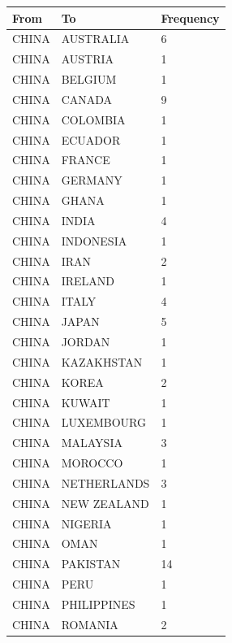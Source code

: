 \begin{longtable}{@{}|l|l|l|@{}}
\toprule
From  & To              & Frequency \\* \midrule
\endfirsthead
%
\endhead
%
\bottomrule
\endfoot
%
\endlastfoot
%
CHINA & AUSTRALIA       & 6         \\
CHINA & AUSTRIA         & 1         \\
CHINA & BELGIUM         & 1         \\
CHINA & CANADA          & 9         \\
CHINA & COLOMBIA        & 1         \\
CHINA & ECUADOR         & 1         \\
CHINA & FRANCE          & 1         \\
CHINA & GERMANY         & 1         \\
CHINA & GHANA           & 1         \\
CHINA & INDIA           & 4         \\
CHINA & INDONESIA       & 1         \\
CHINA & IRAN            & 2         \\
CHINA & IRELAND         & 1         \\
CHINA & ITALY           & 4         \\
CHINA & JAPAN           & 5         \\
CHINA & JORDAN          & 1         \\
CHINA & KAZAKHSTAN      & 1         \\
CHINA & KOREA           & 2         \\
CHINA & KUWAIT          & 1         \\
CHINA & LUXEMBOURG      & 1         \\
CHINA & MALAYSIA        & 3         \\
CHINA & MOROCCO         & 1         \\
CHINA & NETHERLANDS     & 3         \\
CHINA & NEW ZEALAND     & 1         \\
CHINA & NIGERIA         & 1         \\
CHINA & OMAN            & 1         \\
CHINA & PAKISTAN        & 14        \\
CHINA & PERU            & 1         \\
CHINA & PHILIPPINES     & 1         \\
CHINA & ROMANIA         & 2         \\

\end{longtable}

